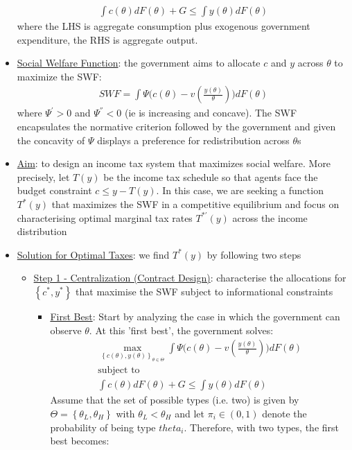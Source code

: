 \documentclass{article}
\begin{document}
\begin{itemize}
\begin{gather*}
        \int c(\theta) dF(\theta) + G \leq \int y(\theta) dF(\theta)
    \end{gather*}
    where the LHS is aggregate consumption plus exogenous government expenditure, the RHS is aggregate output.
    \item  \underline{Social Welfare Function}: the government aims to allocate $c$ and $y$ across $\theta$ to maximize the SWF:
    \begin{gather*}
        SWF = \int \Psi \big( c (\theta) - v(\frac{y(\theta)}{\theta}) \big) d F(\theta)
    \end{gather*}
    where $\Psi^{'} > 0$ and $\Psi^{''} < 0$ (ie is increasing and concave). The SWF encapsulates the normative criterion followed by the government and given the concavity of $\Psi$ displays a preference for redistribution across $\theta$s
    \item \underline{Aim}: to design an income tax system that maximizes social welfare. More precisely, let $T(y)$ be the income tax schedule so that agents face the budget constraint $c \leq y - T(y)$. In this case, we are seeking a function $T^{*}(y)$ that maximizes the SWF in a competitive equilibrium and focus on characterising optimal marginal tax rates $T^{*'}(y)$ across the income distribution
    \item  \underline{Solution for Optimal Taxes}: we find $T^{*}(y)$ by following two steps
    \begin{itemize}
        \item  \underline{Step 1 - Centralization (Contract Design)}: characterise the allocations for $\left\{ c^{*}, y^{*} \right\}$ that maximise the SWF subject to informational constraints
        \begin{itemize}
            \item \underline{First Best}: Start by analyzing the case in which the government can observe $\theta$. At this 'first best', the government solves:
            \begin{gather*}
                \max_{\left\{c(\theta), y(\theta) \right\}_{\theta \in \Theta} } \int \Psi \big( c (\theta) - v(\frac{y(\theta)}{\theta}) \big) d F(\theta) \\
                \text{subject to} \\
                \int c(\theta) dF(\theta) + G \leq \int y(\theta) dF(\theta) \tag{RC}
            \end{gather*}
            Assume that the set of possible types (i.e. two) is given by $\Theta = \left\{\theta_{L}, \theta_{H} \right\}$ with $\theta_{L} < \theta_{H}$ and let $\pi_{i} \in (0,1)$ denote the probability of being type $theta_{i}$. Therefore, with two types, the first best becomes:

\end{itemize}
\end{itemize}
\end{itemize}
\end{document}
